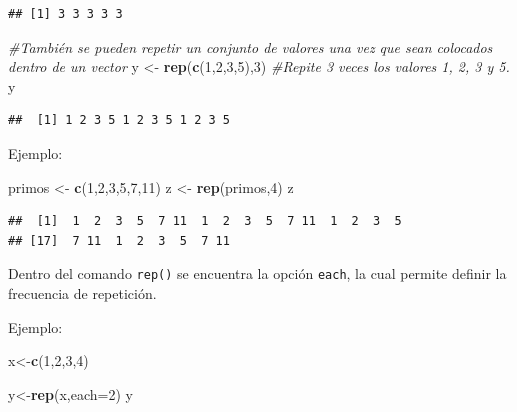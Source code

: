 \documentclass[
]{book}
\newenvironment{Shaded}{\begin{snugshade}}{\end{snugshade}}
\newcommand{\AttributeTok}[1]{\textcolor[rgb]{0.13,0.29,0.53}{#1}}
\newcommand{\CommentTok}[1]{\textcolor[rgb]{0.56,0.35,0.01}{\textit{#1}}}
\newcommand{\DecValTok}[1]{\textcolor[rgb]{0.00,0.00,0.81}{#1}}
\newcommand{\FunctionTok}[1]{\textcolor[rgb]{0.13,0.29,0.53}{\textbf{#1}}}
\newcommand{\NormalTok}[1]{#1}
\newcommand{\OtherTok}[1]{\textcolor[rgb]{0.56,0.35,0.01}{#1}}
\begin{document}
\begin{verbatim}
## [1] 3 3 3 3 3
\end{verbatim}

\begin{Shaded}
\begin{Highlighting}[]
\CommentTok{\#También se pueden repetir un conjunto de valores una vez que sean colocados dentro de un vector}
\NormalTok{y }\OtherTok{\textless{}{-}} \FunctionTok{rep}\NormalTok{(}\FunctionTok{c}\NormalTok{(}\DecValTok{1}\NormalTok{,}\DecValTok{2}\NormalTok{,}\DecValTok{3}\NormalTok{,}\DecValTok{5}\NormalTok{),}\DecValTok{3}\NormalTok{) }\CommentTok{\#Repite 3 veces los valores 1, 2, 3 y 5. }
\NormalTok{y}
\end{Highlighting}
\end{Shaded}

\begin{verbatim}
##  [1] 1 2 3 5 1 2 3 5 1 2 3 5
\end{verbatim}

Ejemplo:

\begin{Shaded}
\begin{Highlighting}[]
\NormalTok{primos }\OtherTok{\textless{}{-}} \FunctionTok{c}\NormalTok{(}\DecValTok{1}\NormalTok{,}\DecValTok{2}\NormalTok{,}\DecValTok{3}\NormalTok{,}\DecValTok{5}\NormalTok{,}\DecValTok{7}\NormalTok{,}\DecValTok{11}\NormalTok{)}
\NormalTok{z }\OtherTok{\textless{}{-}} \FunctionTok{rep}\NormalTok{(primos,}\DecValTok{4}\NormalTok{)}
\NormalTok{z}
\end{Highlighting}
\end{Shaded}

\begin{verbatim}
##  [1]  1  2  3  5  7 11  1  2  3  5  7 11  1  2  3  5
## [17]  7 11  1  2  3  5  7 11
\end{verbatim}

Dentro del comando \texttt{rep()} se encuentra la opción \texttt{each}, la cual permite definir la frecuencia de repetición.

Ejemplo:

\begin{Shaded}
\begin{Highlighting}[]
\NormalTok{x}\OtherTok{\textless{}{-}}\FunctionTok{c}\NormalTok{(}\DecValTok{1}\NormalTok{,}\DecValTok{2}\NormalTok{,}\DecValTok{3}\NormalTok{,}\DecValTok{4}\NormalTok{)}

\NormalTok{y}\OtherTok{\textless{}{-}}\FunctionTok{rep}\NormalTok{(x,}\AttributeTok{each=}\DecValTok{2}\NormalTok{)}
\NormalTok{y}
\end{Highlighting}
\end{Shaded}
\end{document}
